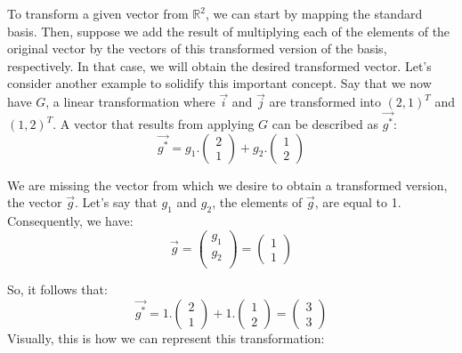 \documentclass[a4,12pt,twosided,openany]{memoir}
\begin{document}
To transform a given vector from $\mathbb{R}^2$, we can start by mapping the standard basis. Then, suppose we add the result of multiplying each of the elements of the original vector by the vectors of this transformed version of the basis, respectively. In that case, we will obtain the desired transformed vector. Let’s consider another example to solidify this important concept. Say that we now have $G$, a linear transformation where $\overrightarrow{i}$ and $\overrightarrow{j}$ are transformed into $(2,1)^T$ and $(1,2)^T$. A vector that results from applying $G$ can be described as $\overrightarrow{g^*}$:
\begin{equation}\label{eq:transfG}
\overrightarrow{g^*} = g_1.\begin{pmatrix}
 2\\
 1
 \end{pmatrix} + g_2.\begin{pmatrix}
 1\\
 2
 \end{pmatrix}
\end{equation}
\par 
\indent
We are missing the vector from which we desire to obtain a transformed version, the vector $\overrightarrow{g}$. Let’s say that $g_1$ and $g_2$, the elements of $\overrightarrow{g}$, are equal to 1. Consequently, we have:
\[ \overrightarrow{g} = \begin{pmatrix}
 g_1\\
 g_2\\
 \end{pmatrix} = \begin{pmatrix}
 1\\
 1
 \end{pmatrix}\]
\par 
\indent
So, it follows that:
\[ \overrightarrow{g^*} = 1.\begin{pmatrix}
 2\\
 1
 \end{pmatrix} + 1.\begin{pmatrix}
 1\\
 2
 \end{pmatrix} = \begin{pmatrix}
 3\\
 3
 \end{pmatrix} \]
Visually, this is how we can represent this transformation:
\end{document}
